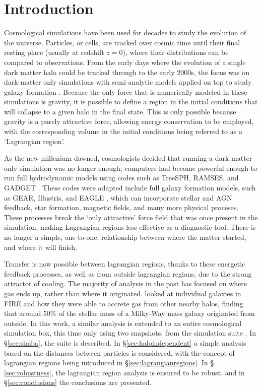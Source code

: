 \section{Introduction}
\label{sec:introduction}

Cosmological simulations have been used for decades to study the evolution of
the universe. Particles, or cells, are tracked over cosmic time until their
final resting place (usually at redshift $z=0$), where their distributions can
be compared to observations. From the early days where the evolution of a
single dark matter halo could be tracked through to the early 2000s, the focus
was on dark-matter only simulations \citep{frenk1988,
springel_simulations_2005} with semi-analytic models applied on top to study
galaxy formation \citep{porter_2014, henriques_2015, lacey_2016}. Because the
only force that is numerically modeled in these simulations is gravity, it is
possible to define a region in the initial conditions that will collapse to a
given halo in the final state. This is only possible because gravity is a
purely attractive force, allowing energy conservation to be employed, with the
corresponding volume in the initial conditions being referred to as a
`Lagrangian region'.

As the new millenium dawned, cosmologists decided that running a dark-matter
only simulation was no longer enough; computers had become powerful enough to
run full hydrodynamic models using codes such as TreeSPH, RAMSES, and GADGET
\citep{Hernquist1989, teyssier2002, Springel2005}. These codes were adapted
include full galaxy formation models, such as GEAR, Illustris, and EAGLE
\citep{Revaz2011, vogelsberger_properties_2014, Schaye2015}, which can
incorporate stellar and AGN feedback, star formation, magnetic fields, and many
more physical proceses.  These processes break the `only attractive' force
field that was once present in the simulation, making Lagrangian regions less
effective as a diagnostic tool. There is no longer a simple, one-to-one,
relationship between where the matter started, and where it will finish.

Transfer is now possible between lagrangian regions, thanks to these energetic
feedback processes, as well as from outside lagrangian regions, due to the
strong attractor of cooling. The majority of analysis in the past has focused
on where gas ends up, rather than where it originated.
\citet{anglesalcazar2016} looked at individual galaxies in FIRE
\citep{fireproject2014} and how they were able to accrete gas from other nearby
halos, finding that around 50\% of the stellar mass of a Milky-Way mass galaxy
originated from outside. In this work, a similar analysis is extended to an
entire cosmological simulation box, this time only using two snapshots, from
the \simba{} simulation suite \citep{dave2018}. In \S \ref{sec:simba}, the
\simba{} suite is described.  In \S \ref{sec:haloindependent} a simple analysis
based on the distances between particles is considered, with the concept of
lagrangian regions being introduced in \S \ref{sec:lagrangianregions}. In \S
\ref{sec:robustness}, the lagrangian region analysis is ensured to be robust,
and in \S \ref{sec:conclusions} the conclusions are presented.
